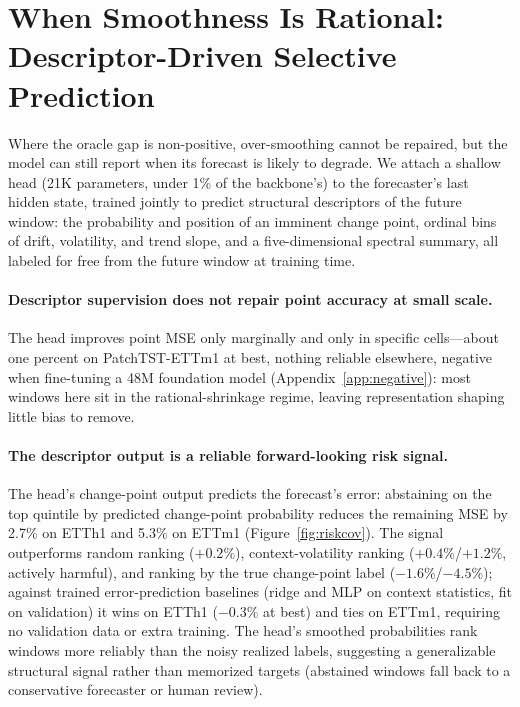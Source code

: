 \section{When Smoothness Is Rational: Descriptor-Driven Selective Prediction}
\label{sec:decision}

Where the oracle gap is non-positive, over-smoothing cannot be repaired, but the model can still report when its forecast is likely to degrade. We attach a shallow head (21K parameters, under 1\% of the backbone's) to the forecaster's last hidden state, trained jointly to predict structural descriptors of the future window: the probability and position of an imminent change point, ordinal bins of drift, volatility, and trend slope, and a five-dimensional spectral summary, all labeled for free from the future window at training time.

\paragraph{Descriptor supervision does not repair point accuracy at small scale.}
The head improves point MSE only marginally and only in specific cells---about one percent on PatchTST-ETTm1 at best, nothing reliable elsewhere, negative when fine-tuning a 48M foundation model (Appendix~\ref{app:negative}): most windows here sit in the rational-shrinkage regime, leaving representation shaping little bias to remove.

\paragraph{The descriptor output is a reliable forward-looking risk signal.}
The head's change-point output predicts the forecast's error: abstaining on the top quintile by predicted change-point probability reduces the remaining MSE by 2.7\% on ETTh1 and 5.3\% on ETTm1 (Figure~\ref{fig:riskcov}). The signal outperforms random ranking ($+0.2\%$), context-volatility ranking ($+0.4\%$/$+1.2\%$, actively harmful), and ranking by the true change-point label ($-1.6\%$/$-4.5\%$); against trained error-prediction baselines (ridge and MLP on context statistics, fit on validation) it wins on ETTh1 ($-0.3\%$ at best) and ties on ETTm1, requiring no validation data or extra training. The head's smoothed probabilities rank windows more reliably than the noisy realized labels, suggesting a generalizable structural signal rather than memorized targets (abstained windows fall back to a conservative forecaster or human review).

